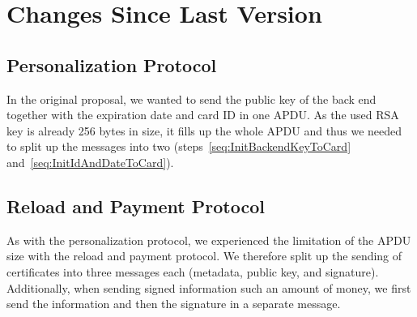 \documentclass{article}
\begin{document}
\section{Changes Since Last Version}
    \subsection{Personalization Protocol}
    In the original proposal, we wanted to send the public key of the back end together with the expiration date and card ID in one APDU\@.
    As the used RSA key is already 256 bytes in size, it fills up the whole APDU and thus we needed to split up the messages into two (steps~\ref{seq:InitBackendKeyToCard} and~\ref{seq:InitIdAndDateToCard}).

    \subsection{Reload and Payment Protocol}
    As with the personalization protocol, we experienced the limitation of the APDU size with the reload and payment protocol.
    We therefore split up the sending of certificates into three messages each (metadata, public key, and signature).
    Additionally, when sending signed information such an amount of money, we first send the information and then the signature in a separate message.
\end{document}
